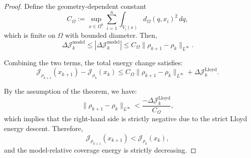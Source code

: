 \documentclass[10pt,a4paper]{amsart}
\begin{document}
\begin{proof}
Define the geometry-dependent constant
\[
    C_\Omega := \sup_{x \in \Omega^n} \sum_{i=1}^n \int_{V_i(x)} d_\Omega(q, x_i)^2 \, dq,
\]
which is finite on $\Omega$ with bounded diameter. %
Then,
\[
    \Delta\mathcal{J}_k^{\mathrm{model}} \leq |\Delta\mathcal{J}_k^{\mathrm{model}}| \leq C_\Omega \|\rho_{k+1} - \rho_k\|_{L^\infty}.
\]

Combining the two terms, the total energy change satisfies:
\[
    \mathcal{J}_{\rho_{k+1}}(x_{k+1}) - \mathcal{J}_{\rho_k}(x_k)
    \leq C_\Omega \|\rho_{k+1} - \rho_k\|_{L^\infty} + \Delta\mathcal{J}_k^{\mathrm{Lloyd}}.
\]

By the assumption of the theorem, we have:
\[
    \|\rho_{k+1} - \rho_k\|_{L^\infty} < \frac{-\Delta\mathcal{J}_k^{\mathrm{Lloyd}}}{C_\Omega},
\]
which implies that the right-hand side is strictly negative due to the strict Lloyd energy descent. Therefore,
\[
    \mathcal{J}_{\rho_{k+1}}(x_{k+1}) < \mathcal{J}_{\rho_k}(x_k),
\]
and the model-relative coverage energy is strictly decreasing.
\end{proof}
\end{document}
